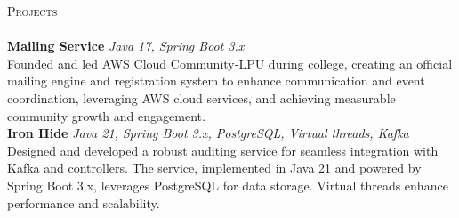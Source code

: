 \documentclass[a4paper]{article}
\newcommand{\lineunder} {
    \vspace*{-8pt} \\
    \hspace*{-18pt} \hrulefill \\
}
\newcommand{\header} [1] {
    {\hspace*{-18pt}\vspace*{6pt} \textsc{#1}}
    \vspace*{-6pt} \lineunder
}
\begin{document}
\header{Projects}
{\textbf{Mailing Service}} {\sl Java 17, Spring Boot 3.x} \hfill \href{https://github.com/AWS-Cloud-Community-LPU/mailing-service}{\faGithub}\\
Founded and led AWS Cloud Community-LPU during college, creating an official mailing engine and registration system to enhance communication and event coordination, leveraging AWS cloud services, and achieving measurable community growth and engagement.\\
\vspace*{2mm}
{\textbf{Iron Hide}} {\sl Java 21, Spring Boot 3.x, PostgreSQL, Virtual threads, Kafka} \hfill \href{https://github.com/garvit-joshi/ironhide}{\faGithub}\\
Designed and developed a robust auditing service for seamless integration with Kafka and controllers. The service, implemented in Java 21 and powered by Spring Boot 3.x, leverages PostgreSQL for data storage. Virtual threads enhance performance and scalability.\\
\vspace*{2mm}
\ 
\end{document}
